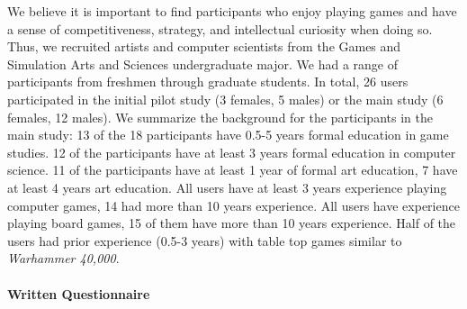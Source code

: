 \documentclass[10pt,twocolumn,letterpaper]{article}
\begin{document}
We believe it is important to find participants who enjoy playing
games and have a sense of competitiveness, strategy, and intellectual
curiosity when doing so.
%
Thus, we recruited artists and computer scientists from the Games and
Simulation Arts and Sciences undergraduate major.
%
%
%
We had a range of participants from freshmen through graduate
students.  
%
In total, 26 users participated in the initial pilot study (3 females,
5 males) or the main study (6 females, 12 males).  
We summarize the background for the participants in the main
study: 13 of the 18 participants 
have 0.5-5 years formal education in game studies.  12 of the
participants have at least 3 years formal education in computer
science.  11 of the participants have at least 1 year of formal art
education, 7 have at least 4 years art education.  All users have at
least 3 years experience playing computer games, 14 had more than 10
years experience.  All users have experience playing board games, 15 of
them have more than 10 years experience.  Half of the users had prior
experience (0.5-3 years) with table top games similar to {\em
  Warhammer 40,000}.  

\vspace{-0.15in}
\paragraph{Written Questionnaire}
\end{document}
